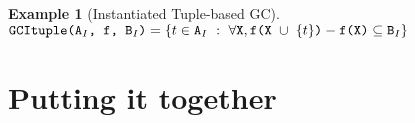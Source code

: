 \documentclass[10pt]{proc}
\numberwithin{equation}{section}
\newtheorem{example}{Example}[section]
\renewcommand{\tt}[1]{\ifmmode\text{\texttt{#1}}\else\texttt{#1}\fi}
\begin{document}
\begin{example}[Instantiated Tuple-based GC]
$\tt{GCItuple(A$_I$, f, B$_I$)} = \{t \in \tt{A}_I ~:~ \forall \tt{X}, \tt{f(X $\cup$ $\{t\}$)} - \tt{f(X)} \subseteq \tt{B}_I\}$
\end{example}
\section{Putting it together}

\newpage
\balance





\end{document}
